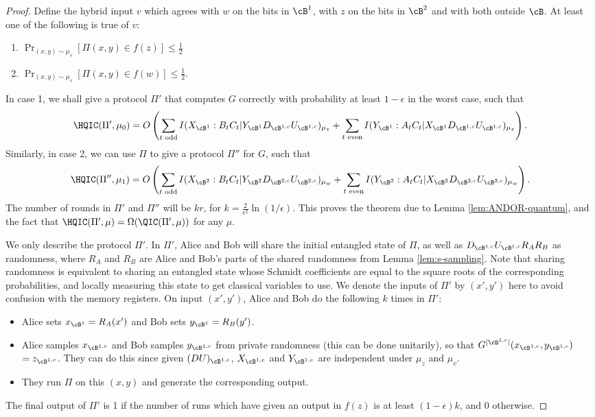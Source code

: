 \begin{proof}
Define the hybrid input $v$ which agrees with $w$ on the bits in $\cB^1$, with $z$ on the bits in $\cB^2$ and with both outside $\cB$. At least one of the following is true of $v$:
\begin{enumerate}
    \item $\Pr_{(x,y)\sim \mu_v}[\Pi(x,y) \in f(z)] \leq \frac{1}{2}$
    \item $\Pr_{(x,y)\sim \mu_v}[\Pi(x,y) \in f(w)] \leq \frac{1}{2}$.
\end{enumerate}
In case 1, we shall give a protocol $\Pi'$ that computes $G$ correctly with probability at least $1-\epsilon$ in the worst case, such that
\[\HQIC(\Pi', \mu_0) = O\left(\sum_{t\text{ odd}}I(X_{\cB^1}:B_tC_t|Y_{\cB^1}D_{\cB^{1,c}}U_{\cB^{1,c}})_{\mu_z} + \sum_{t\text{ even}}I(Y_{\cB^1}:A_tC_t|X_{\cB^1}D_{\cB^{1,c}}U_{\cB^{1,c}})_{\mu_z}\right).\]
Similarly, in case 2, we can use $\Pi$ to give a protocol $\Pi''$ for $G$, such that
\[ \HQIC(\Pi'', \mu_1) = O\left(\sum_{t\text{ odd}}I(X_{\cB^2}:B_tC_t|Y_{\cB^2}D_{\cB^{2,c}}U_{\cB^{2,c}})_{\mu_w} + \sum_{t\text{ even}}I(Y_{\cB^2}:A_tC_t|X_{\cB^2}D_{\cB^{2,c}}U_{\cB^{2,c}})_{\mu_w}\right).\]
The number of rounds in $\Pi'$ and $\Pi''$ will be $kr$, for $k=\frac{2}{\epsilon^2}\ln(1/\epsilon)$. This proves the theorem due to Lemma \ref{lem:ANDOR-quantum}, and the fact that $\HQIC(\Pi', \mu) =\Omega( \QIC(\Pi',\mu))$ for any $\mu$.

We only describe the protocol $\Pi'$. In $\Pi'$, Alice and Bob will share the initial entangled state of $\Pi$, as well as $D_{\cB^{1,c}}U_{\cB^{1,c}}R_AR_B$ as randomness, where $R_A$ and $R_B$ are Alice and Bob's parts of the shared randomness from Lemma \ref{lem:s-sampling}. Note that sharing randomness is equivalent to sharing an entangled state whose Schmidt coefficients are equal to the square roots of the corresponding probabilities, and locally measuring this state to get classical variables to use. We denote the inputs of $\Pi'$ by $(x',y')$ here to avoid confusion with the memory registers. On input $(x',y')$, Alice and Bob do the following $k$ times in $\Pi'$:
\begin{itemize}
\item Alice sets $x_{\cB^1} = R_A(x')$ and Bob sets $y_{\cB^1} = R_B(y')$.
\item Alice samples $x_{\cB^{1,c}}$ and Bob samples $y_{\cB^{1,c}}$ from private randomness (this can be done unitarily), so that $G^{|\cB^{1,c}|}(x_{\cB^{1,c}},y_{\cB^{1,c}})$ $= z_{\cB^{1,c}}$. They can do this since given $(DU)_{\cB^{1,c}}$, $X_{\cB^{1,c}}$ and $Y_{\cB^{1,c}}$ are independent under $\mu_z$ and $\mu_v$.
\item They run $\Pi$ on this $(x,y)$ and generate the corresponding output.
\end{itemize}
The final output of $\Pi'$ is 1 if the number of runs which have given an output in $f(z)$ is at least $(1-\epsilon)k$, and 0 otherwise.


\end{proof}
